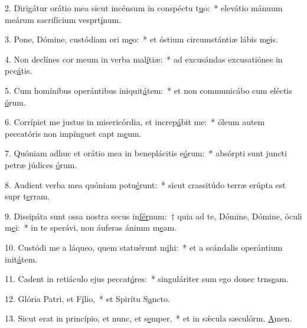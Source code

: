 2. Dirigátur orátio mea sicut incénsum in conspéctu t\uline{u}o:~* elevátio mánuum meárum sacrifícium vesprt\uline{í}num.\par 
3. Pone, Dómine, custódiam ori m\uline{e}o:~* et óstium circumstántiæ lábis m\uline{e}is.\par 
4. Non declínes cor meum in verba mal\uline{í}tiæ:~* ad excusándas excusatiónes in pcc\uline{á}tis.\par 
5. Cum homínibus operántibus iniquit\uline{á}tem:~* et non communicábo cum eléctis \uline{ó}rum.\par 
6. Corrípiet me justus in misericórdia, et increp\uline{á}bit me:~* óleum autem peccatóris non impínguet capt m\uline{e}um.\par 
7. Quóniam adhuc et orátio mea in beneplácitis e\uline{ó}rum:~* absórpti sunt juncti petræ júdices \uline{ó}rum.\par 
8. Audient verba mea quóniam potu\uline{é}runt:~* sicut crassitúdo terræ erúpta est supr t\uline{e}rram.\par 
9. Dissipáta sunt ossa nostra secus in\uline{fér}num:~† quia ad te, Dómine, Dómine, óculi m\uline{e}i:~* in te sperávi, non áuferas ánimm m\uline{e}am.\par 
10. Custódi me a láqueo, quem statuérunt m\uline{i}hi:~* et a scándalis operántium init\uline{á}tem.\par 
11. Cadent in retiáculo ejus peccat\uline{ó}res:~* singuláriter sum ego donec trns\uline{e}am.\par 
12. Glória Patri, et F\uline{í}lio,~* et Spirítu S\uline{a}ncto.\par 
13. Sicut erat in princípio, et nunc, et s\uline{e}mper,~* et in sǽcula sæculórm. \uline{A}men.\par 
